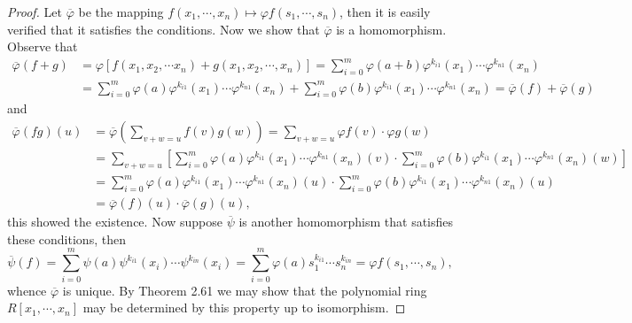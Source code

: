\begin{proof}
Let $\overline{\varphi}$ be the mapping $f(x_1,\cdots,x_n)\mapsto\varphi f(s_1,\cdots,s_n)$, then it is easily verified that it satisfies the conditions. Now we show that $\overline{\varphi}$ is a homomorphism. Observe that 
$$
\begin{aligned}
\overline{\varphi }\left( f+g \right) &=\varphi \left[ f\left( x_1,x_2,\cdots x_n \right) +g\left( x_1,x_2,\cdots ,x_n \right) \right] =\sum_{i=0}^m{\varphi \left( a+b \right) \varphi ^{k_{i1}}\left( x_1 \right) \cdots \varphi ^{k_{n1}}\left( x_n \right)}
\\
&=\sum_{i=0}^m{\varphi \left( a \right) \varphi ^{k_{i1}}\left( x_1 \right) \cdots \varphi ^{k_{n1}}\left( x_n \right)}+\sum_{i=0}^m{\varphi \left( b \right) \varphi ^{k_{i1}}\left( x_1 \right) \cdots \varphi ^{k_{n1}}\left( x_n \right)}=\overline{\varphi }\left( f \right) +\overline{\varphi }\left( g \right) 
\end{aligned}
$$
and 
$$
\begin{aligned}
\overline{\varphi }\left( fg \right) \left( u \right) &=\overline{\varphi }\left( \sum_{v+w=u}{f\left( v \right) g\left( w \right)} \right) =\sum_{v+w=u}{\varphi f\left( v \right) \cdot \varphi g\left( w \right)}
\\
&=\sum_{v+w=u}{\left[ \sum_{i=0}^m{\varphi \left( a \right) \varphi ^{k_{i1}}\left( x_1 \right) \cdots \varphi ^{k_{n1}}\left( x_n \right) \left( v \right)}\cdot \sum_{i=0}^m{\varphi \left( b \right) \varphi ^{k_{i1}}\left( x_1 \right) \cdots \varphi ^{k_{n1}}\left( x_n \right) \left( w \right)} \right]}
\\
&=\sum_{i=0}^m{\varphi \left( a \right) \varphi ^{k_{i1}}\left( x_1 \right) \cdots \varphi ^{k_{n1}}\left( x_n \right) \left( u \right)}\cdot \sum_{i=0}^m{\varphi \left( b \right) \varphi ^{k_{i1}}\left( x_1 \right) \cdots \varphi ^{k_{n1}}\left( x_n \right) \left( u \right)}
\\
&=\overline{\varphi }\left( f \right) \left( u \right) \cdot \overline{\varphi }\left( g \right) \left( u \right) ,
\end{aligned}
$$
this showed the existence. Now suppose $\overline{\psi}$ is another homomorphism that satisfies these conditions, then 
$$
\overline{\psi }\left( f \right) =\sum_{i=0}^m{\psi \left( a \right) \psi ^{k_{i1}}\left( x_i \right) \cdots \psi ^{k_{in}}\left( x_i \right)}=\sum_{i=0}^m{\varphi \left( a \right) s_{1}^{k_{i1}}\cdots s_{n}^{k_{in}}}=\varphi f\left( s_1,\cdots ,s_n \right) ,
$$
whence $\overline{\varphi}$ is unique. By Theorem 2.61 we may show that the polynomial ring $R[x_1,\cdots,x_n]$ may be determined by this property up to isomorphism.
\end{proof}
